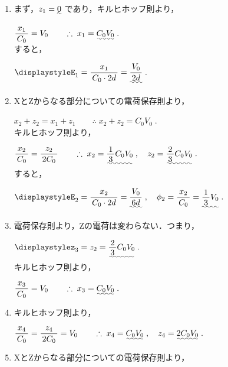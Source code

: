 ﻿\documentclass[../../../ps_a.tex]{subfiles}
\begin{document}
    \begin{enumerate}
        \item まず，$z_1 = \uwave{0}$ であり，キルヒホッフ則より，
            
            \myspaceb%
            $\displaystyle%
                \myfracc{x_1}{C_0} = V_0%
                \qquad \therefore \; x_1 = \uwave{C_0 V_0} \;.
            $\\            
            すると，
            
            \myspaceb%
            $\displaystyle%
                E_1 = \myfracc{x_1}{C_0 \cdot 2d} = \uwave{\myfracc{V_0}{2d}} \;.
            $
        \item XとZからなる部分についての電荷保存則より，
            
            \myspaceb%
            $\displaystyle%
                x_2 + z_2 = x_1 + z_1%
                \qquad \therefore \; x_2 + z_2 = C_0 V_0 \;.
            $\\
            キルヒホッフ則より，
            
            \myspaceb%
            $\displaystyle%
                \myfracc{x_2}{C_0} = \myfracc{z_2}{2C_0} %
                \qquad \therefore \; x_2 = \uwave{\myfraca{1}{3} C_0 V_0} \;,%
                \quad z_2 = \uwave{\myfraca{2}{3} C_0 V_0} \;.
            $\\
            すると，
            
            \myspaceb%
            $\displaystyle%
                E_2 = \myfracc{x_2}{C_0 \cdot 2d} = \uwave{\myfracc{V_0}{6d}} \;,%
                \quad \phi_2 = \myfracc{x_2}{C_0} = \uwave{\myfraca{1}{3} V_0} \;.
            $
        \item 電荷保存則より，Zの電荷は変わらない．つまり，
            
            \myspaceb%
            $\displaystyle%
                z_3 = z_2 = \uwave{\myfraca{2}{3} C_0 V_0} \;.
            $\\
            キルヒホッフ則より，
            
            \myspaceb%
            $\displaystyle%
                \myfracc{x_3}{C_0} = V_0%
                \qquad \therefore \; x_3 = \uwave{C_0 V_0} \;.
            $
        \item キルヒホッフ則より，
            
            \myspaceb%
            $\displaystyle%
                \myfracc{x_4}{C_0} = \myfracc{z_4}{2C_0} = V_0%
                \qquad \therefore \; x_4 = \uwave{C_0 V_0} \;,%
                \quad z_4 = \uwave{2C_0 V_0} \;.
            $
        \item XとZからなる部分についての電荷保存則より，
            

\end{enumerate}
\end{document}
